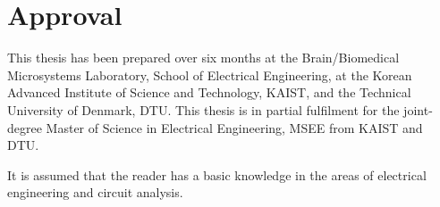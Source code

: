 \thispagestyle{main}
\setcounter{page}{1}
\chapter*{Approval}
This thesis has been prepared over six months at the Brain/Biomedical Microsystems Laboratory, School of Electrical Engineering, at the Korean Advanced Institute of Science and Technology, KAIST, and the Technical University of Denmark, DTU. This thesis is in partial fulfilment for the joint-degree Master of Science in Electrical Engineering, MSEE from KAIST and DTU.

It is assumed that the reader has a basic knowledge in the areas of electrical engineering and circuit analysis. 

\vfill

\begin{center}
\namesigdate{\thesisauthor~-~\studentnumber}
\end{center}

\vfill


